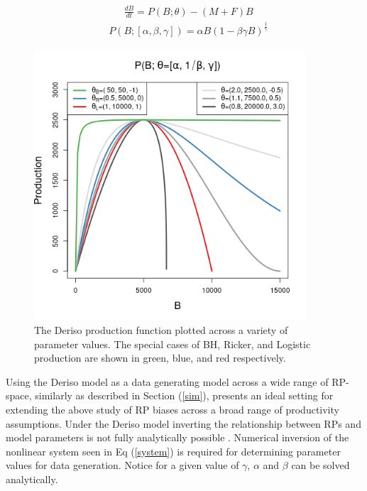 \documentclass[12pt]{article}
\begin{document}
%
\vspace{-0.5cm}
\begin{figure}[h!]
\begin{minipage}[h!]{0.49\textwidth}
\begin{align}
&\frac{dB}{dt} = P(B;\theta) - (M+F)B \nonumber%
\end{align}
\begin{align}
&P(B;[\alpha, \beta, \gamma]) = \alpha B(1-\beta\gamma B)^{\frac{1}{\gamma}} \nonumber
\end{align}
\caption{
The Deriso production function plotted across a variety of parameter 
values. The special cases of BH, Ricker, and Logistic production are shown in 
green, blue, and red respectively.
} 
\end{minipage} 
\begin{minipage}[h!]{0.49\textwidth}
\includegraphics[width=0.9\textwidth]{plots/derisoSrr.png}
\end{minipage}
\end{figure}

%
\vspace{-0.5cm}
Using the Deriso model as a data generating model across a wide range 
of RP-space, similarly as described in Section (\ref{sim}), %
presents an ideal setting for extending the above study of RP biases across a 
broad range of productivity assumptions. Under the Deriso model inverting the 
relationship between RPs and model parameters is not fully analytically possible 
. Numerical inversion of the nonlinear system 
seen in Eq (\ref{system}) is required for determining parameter values for data 
generation. Notice for a given value of $\gamma$, $\alpha$ and $\beta$ can 
be solved analytically.
\end{document}
